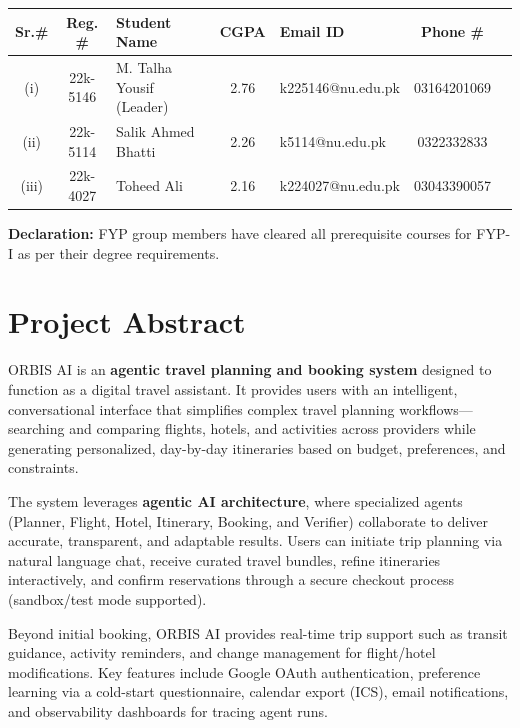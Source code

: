 \documentclass[12pt,a4paper]{article}
\begin{document}
\begin{tabular}{|c|c|p{3.5cm}|c|p{3.5cm}|c|c|}
\hline
\textbf{Sr.\#} & \textbf{Reg. \#} & \textbf{Student Name} & \textbf{CGPA} & \textbf{Email ID} & \textbf{Phone \#} \\
\hline
(i) & 22k-5146 & M. Talha Yousif (Leader) & 2.76 & k225146@nu.edu.pk & 03164201069 \\[0.8cm]
\hline
(ii) & 22k-5114 & Salik Ahmed Bhatti & 2.26 & k5114@nu.edu.pk & 0322332833 \\[0.8cm]
\hline
(iii) & 22k-4027 & Toheed Ali & 2.16 & k224027@nu.edu.pk & 03043390057 \\[0.8cm]
\hline
\end{tabular}

\vspace{0.5cm}

\textbf{Declaration:} FYP group members have cleared all prerequisite courses for FYP-I as per their degree requirements.

\newpage

\section*{Project Abstract }

ORBIS AI is an \textbf{agentic travel planning and booking system} designed to function as a digital travel assistant. It provides users with an intelligent, conversational interface that simplifies complex travel planning workflows—searching and comparing flights, hotels, and activities across providers while generating personalized, day-by-day itineraries based on budget, preferences, and constraints.

The system leverages \textbf{agentic AI architecture}, where specialized agents (Planner, Flight, Hotel, Itinerary, Booking, and Verifier) collaborate to deliver accurate, transparent, and adaptable results. Users can initiate trip planning via natural language chat, receive curated travel bundles, refine itineraries interactively, and confirm reservations through a secure checkout process (sandbox/test mode supported).

Beyond initial booking, ORBIS AI provides real-time trip support such as transit guidance, activity reminders, and change management for flight/hotel modifications. Key features include Google OAuth authentication, preference learning via a cold-start questionnaire, calendar export (ICS), email notifications, and observability dashboards for tracing agent runs.
\end{document}
